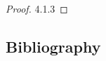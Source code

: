 \documentclass{article}
\newtheorem{proof}{Proof}
\begin{document}
\begin{proof}
    \cite{salamon} 4.1.3
\end{proof}


\subsection{Bibliography}

\printbibliography
\end{document}
